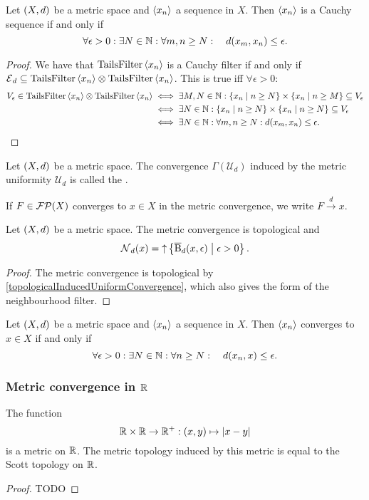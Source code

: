 \begin{lemma}
Let $\left( X,d \right)$ be a metric space and $\left\langle x_n \right\rangle$ a sequence in $X$. Then $\left\langle x_n \right\rangle$ is a Cauchy sequence \textup{if and only if}
\[ \forall \epsilon >0: \exists N\in\mathbb{N}: \forall m,n \geq N: \quad d(x_m, x_n)\leq \epsilon. \]
\end{lemma}
\begin{proof}
We have that $\operatorname{TailsFilter}\left\langle x_n \right\rangle$ is a Cauchy filter \textup{if and only if} $\operatorname{\mathcal{E}}_d \subseteq \operatorname{TailsFilter}\left\langle x_n \right\rangle\otimes \operatorname{TailsFilter}\left\langle x_n \right\rangle$. This is true iff $\forall \epsilon>0$:
\begin{align*}
V_\epsilon \in \operatorname{TailsFilter}\left\langle x_n \right\rangle\otimes \operatorname{TailsFilter}\left\langle x_n \right\rangle &\iff \exists M,N\in\mathbb{N}: \left\{ x_n \;\middle|\; n\geq N \right\}\times\left\{ x_n \;\middle|\; n\geq M \right\} \subseteq V_\epsilon \\
&\iff \exists N\in\mathbb{N}: \left\{ x_n \;\middle|\; n\geq N \right\}\times\left\{ x_n \;\middle|\; n\geq N \right\} \subseteq V_\epsilon \\
&\iff \exists N\in\mathbb{N}: \forall m,n \geq N: d(x_m, x_n)\leq \epsilon.
\end{align*}
\end{proof}

\begin{definition}
Let $\left( X,d \right)$ be a metric space. The convergence $\Gamma(\mathcal{U}_d)$ induced by the metric uniformity $\mathcal{U}_d$ is called the .

If $F\in\operatorname{\mathcal{FP}}(X)$ converges to $x\in X$ in the metric convergence, we write $F\overset{d}{\longrightarrow} x$.
\end{definition}

\begin{lemma}
Let $\left( X,d \right)$ be a metric space. The metric convergence is topological and
\[ \operatorname{\mathcal{N}}_d(x) = \operatorname{\uparrow}\left\{ \operatorname{\overline{B}}_d(x,\epsilon) \;\middle|\; \epsilon >0 \right\}. \]
\end{lemma}
\begin{proof}
The metric convergence is topological by \ref{topologicalInducedUniformConvergence}, which also gives the form of the neighbourhood filter. 
\end{proof}
\begin{corollary}
Let $\left( X,d \right)$ be a metric space and $\left\langle x_n \right\rangle$ a sequence in $X$. Then $\left\langle x_n \right\rangle$ converges to $x\in X$ \textup{if and only if}
\[ \forall \epsilon>0: \exists N\in\mathbb{N}: \forall n\geq N: \quad d(x_n,x)\leq \epsilon. \]
\end{corollary}

\subsubsection{Metric convergence in $\mathbb{R}$}
\begin{lemma}
The function
\[ \mathbb{R}\times \mathbb{R}\to\mathbb{R}^+: (x,y) \mapsto |x-y| \]
is a metric on $\mathbb{R}$. The metric topology induced by this metric is equal to the Scott topology on $\mathbb{R}$.
\end{lemma}
\begin{proof}
TODO
\end{proof}

